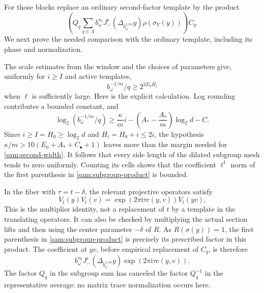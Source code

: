For those blocks replace an ordinary second-factor template by the
product
\begin{equation}\label{sam:subgroup-product}
 \left(
 Q_q\sum_{y\in\Lambda}
 b_\omega^{n_{\mathrm f}}
 J_-^\flat(\Delta_{b_\omega^{1/m}}y)\rho(\sigma_Y(y))
 \right)C_q.
\end{equation}
We next prove the needed comparison with the ordinary template,
including its phase and normalization.

The scale estimates from the window and the choices of parameters
give, uniformly for \(i\ge I\) and active templates,
\begin{equation}\label{sam:second-width}
 b_\omega^{-1/m}/q\ge 2^{2E_0H_i}
\end{equation}
when \(\ell\) is sufficiently large.  Here is the explicit
calculation.  Log rounding contributes a bounded constant, and
\[
 \log_2(b_\omega^{-1/m}/q)
 \ge \frac\kappa m i-\left(A_*-\frac{A_*}{m}\right)\log_2d-C.
\]
Since \(i\ge I=H_0\ge\log_2d\) and \(H_i=H_0+i\le2i\),
the hypothesis
\(\kappa/m>10(E_0+A_*+C_\bullet+1)\) leaves more than the
margin needed for \eqref{sam:second-width}.  It follows that every
side length of the dilated subgroup mesh tends to zero uniformly.
Counting its cells shows that the coefficient \(\ell^1\) norm of
the first parenthesis in \eqref{sam:subgroup-product} is bounded.

In the fiber with \(\tau=t-\delta\), the relevant projective
operators satisfy
\[
 V_t(y)V_t(v)
 =\exp(2\pi\mathrm i\tau c(y,v))V_t(yv).
\]
This is the multiplier identity, not a replacement of \(t\) by a
template in the translating operators.  It can also be checked by
multiplying the actual section lifts and then using the center
parameter \(-\delta\) of \(R\).  As
\(R(\sigma(y))=1\), the first parenthesis in
\eqref{sam:subgroup-product} is precisely its prescribed factor in
this product.  The coefficient at \(yv\), before empirical
replacement of \(C_q\), is therefore
\[
 b_\omega^{n_{\mathrm f}}
 J_-^\flat(\Delta_{b_\omega^{1/m}}y)
 \exp(2\pi\mathrm i\tau c(y,v)).
\]
The factor \(Q_q\) in the subgroup sum has canceled the factor
\(Q_q^{-1}\) in the representative average; no matrix trace
normalization occurs here.

